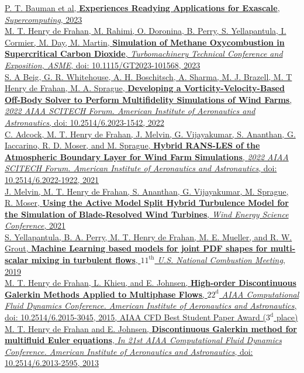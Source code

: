 \documentclass[11pt,letterpaper]{article}
\begin{document}
\href{https://arxiv.org/abs/2310.01586}{P. T. Bauman et al, \textbf{Experiences Readying Applications for Exascale}, \textit{Supercomputing}, 2023}\\[2ex]%
\href{https://doi.org/10.1115/GT2023-101568}{M. T. Henry de Frahan, M. Rahimi, O. Doronina, B. Perry, S. Yellapantula, I. Cormier, M. Day, M. Martin, \textbf{Simulation of Methane Oxycombustion in Supercritical Carbon Dioxide}, \textit{Turbomachinery Technical Conference and Exposition, ASME}, doi: 10.1115/GT2023-101568, 2023}\\[2ex]%
\href{https://doi.org/10.2514/6.2023-1542}{S. A Beig, G. R. Whitehouse, A. H. Boschitsch, A. Sharma, M. J. Brazell, M. T Henry de Frahan, M. A. Sprague, \textbf{Developing a Vorticity-Velocity-Based Off-Body Solver to Perform Multifidelity Simulations of Wind Farms}, \textit{2022 AIAA SCITECH Forum. American Institute of Aeronautics and Astronautics}, doi: 10.2514/6.2023-1542, 2022}\\[2ex]%
\href{https://arc.aiaa.org/doi/abs/10.2514/6.2022-1922}{C. Adcock, M. T. Henry de Frahan, J. Melvin, G. Vijayakumar, S. Ananthan, G. Iaccarino, R. D. Moser, and M. Sprague, \textbf{Hybrid RANS-LES of the Atmospheric Boundary Layer for Wind Farm Simulations}, \textit{2022 AIAA SCITECH Forum. American Institute of Aeronautics and Astronautics}, doi: 10.2514/6.2022-1922, 2021}\\[2ex]%
\href{}{J. Melvin, M. T. Henry de Frahan, S. Ananthan, G. Vijayakumar, M. Sprague, R. Moser, \textbf{Using the Active Model Split Hybrid Turbulence Model for the Simulation of Blade-Resolved Wind Turbines}, \textit{Wind Energy Science Conference}, 2021}\\[2ex]%
\href{}{S. Yellapantula, B. A. Perry, M. T. Henry de Frahan, M. E. Mueller, and R. W. Grout, \textbf{Machine Learning based models for joint PDF shapes for multi-scalar mixing in turbulent flows}, \textit{$11^{\text{th}}$ U.S. National Combustion Meeting}, 2019}\\[2ex]%
\href{http://arc.aiaa.org/doi/pdf/10.2514/6.2015-3045}{M. T. Henry de Frahan, L. Khieu, and E. Johnsen, \textbf{High-order Discontinuous Galerkin Methods Applied to Multiphase Flows}, \textit{$22^{\text{d}}$ AIAA Computational Fluid Dynamics Conference. American Institute of Aeronautics and Astronautics}, doi: 10.2514/6.2015-3045, 2015, AIAA CFD Best Student Paper Award ($3^{\text{d}}$ place)}\\[2ex]%
\href{http://arc.aiaa.org/doi/pdf/10.2514/6.2013-2595}{M. T. Henry de Frahan and E. Johnsen, \textbf{Discontinuous Galerkin method for multifluid Euler equations}, \textit{In 21st AIAA Computational Fluid Dynamics Conference. American Institute of Aeronautics and Astronautics}, doi: 10.2514/6.2013-2595, 2013}\\[2ex]%
\end{document}
